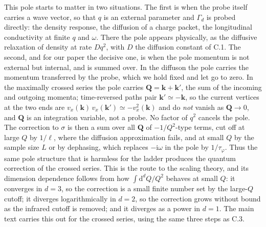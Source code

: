 This pole starts to matter in two situations. The first is when the probe
itself carries a wave vector, so that $q$ is an external parameter
and $\Gamma_d$ is probed directly: the density response, the diffusion
of a charge packet, the longitudinal conductivity at finite $q$ and
$\omega$. There the pole appears physically, as the diffusive relaxation of density
at rate $Dq^2$, with $D$ the diffusion constant of C.1. The second, and for our paper
the decisive one, is when the pole momentum is not external but
internal, and is summed over. In the diffuson the pole carries the
momentum transferred by the probe, which we hold fixed and let go to
zero. In the maximally crossed series the pole carries $\mathbf Q=\mathbf k+\mathbf k'$,
the sum of the incoming and outgoing momenta; time-reversed paths pair
$\mathbf k'\simeq-\mathbf k$, so the current vertices at the two ends
are $v_x(\mathbf k)\,v_x(\mathbf k')\simeq-v_x^2(\mathbf k)$ and do
\emph{not} vanish as $\mathbf Q\to0$, and $\mathbf Q$ is an integration variable, not a probe.
No factor of $q^2$ cancels the pole. The correction to $\sigma$ is then
a sum over all $\mathbf Q$ of $-1/Q^2$-type terms, cut off at large $Q$ by
$1/\ell$, where the diffusion approximation fails, and at small $Q$ by the
sample size $L$ or by dephasing, which replaces $-\mathrm{i}\omega$ in the pole
by $1/\tau_\varphi$. Thus the same pole structure that is harmless for the
ladder produces the quantum correction of the crossed series. This is the
route to the scaling theory, and its dimension dependence follows from
how $\int\mathrm{d}^dQ/Q^2$ behaves at small $Q$: it converges in $d=3$, so the
correction is a small finite number set by the large-$Q$ cutoff; it diverges
logarithmically in $d=2$, so the correction grows without bound as the
infrared cutoff is removed; and it diverges as a power in $d=1$. The main
text carries this out for the crossed series, using the same three steps
as C.3.